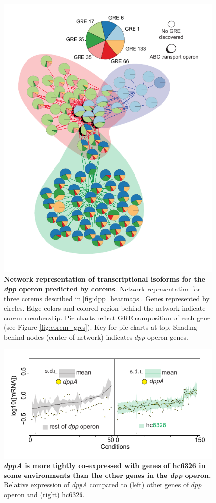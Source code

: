\begin{figure}[h!]
\centering
\includegraphics[width=0.6\linewidth]{figures/dpp_networks.pdf}
\caption[Network representation of transcriptional isoforms for the \textit{dpp} operon predicted by corems]{\textbf{Network representation of transcriptional isoforms for the \textit{dpp} operon predicted by corems.} Network representation for three corems described in \ref{fig:dpp_heatmaps}. Genes represented by circles. Edge colors and colored region behind the network indicate corem membership. Pie charts reflect GRE composition of each gene (see Figure \ref{fig:corem_gres}). Key for pie charts at top. Shading behind nodes (center of network) indicates \textit{dpp} operon genes.}
\label{fig:dpp_networks}
\end{figure}

\begin{figure}[h!]
\centering
\includegraphics[width=0.6\linewidth]{figures/dpp_expression.pdf}
\caption[\textit{dppA} is more tightly co-expressed with genes of hc6326 in some environments than the other genes in the \textit{dpp} operon]{\textbf{\textit{dppA} is more tightly co-expressed with genes of hc6326 in some environments than the other genes in the \textit{dpp} operon.} Relative expression of \textit{dppA} compared to (left) other genes of \textit{dpp} operon and (right) hc6326.}
\label{fig:dpp_expression}
\end{figure}


